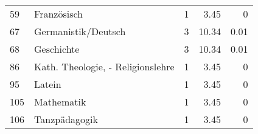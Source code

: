 \begin{longtable}{lXrrr}
     59 &
     \multicolumn{1}{X}{ Französisch   } &


       \num{1} &
       \num[round-mode=places,round-precision=2]{3,45} &
         \num[round-mode=places,round-precision=2]{0} \\

     67 &
     \multicolumn{1}{X}{ Germanistik/Deutsch   } &


       \num{3} &
       \num[round-mode=places,round-precision=2]{10,34} &
         \num[round-mode=places,round-precision=2]{0,01} \\

     68 &
     \multicolumn{1}{X}{ Geschichte   } &


       \num{3} &
       \num[round-mode=places,round-precision=2]{10,34} &
         \num[round-mode=places,round-precision=2]{0,01} \\

     86 &
     \multicolumn{1}{X}{ Kath. Theologie, - Religionslehre   } &


       \num{1} &
       \num[round-mode=places,round-precision=2]{3,45} &
         \num[round-mode=places,round-precision=2]{0} \\

     95 &
     \multicolumn{1}{X}{ Latein   } &


       \num{1} &
       \num[round-mode=places,round-precision=2]{3,45} &
         \num[round-mode=places,round-precision=2]{0} \\

     105 &
     \multicolumn{1}{X}{ Mathematik   } &


       \num{1} &
       \num[round-mode=places,round-precision=2]{3,45} &
         \num[round-mode=places,round-precision=2]{0} \\

     106 &
     \multicolumn{1}{X}{ Tanzpädagogik   } &


       \num{1} &
       \num[round-mode=places,round-precision=2]{3,45} &
         \num[round-mode=places,round-precision=2]{0} \\


\end{longtable}
